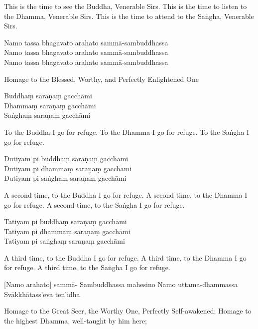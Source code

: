 \begin{english}
This is the time to see the Buddha, Venerable Sirs.
This is the time to listen to the Dhamma, Venerable Sirs.
This is the time to attend to the Saṅgha, Venerable Sirs.
\end{english}

\suttaRef{[Thai]}

Namo tassa bhagavato arahato sammā-sambuddhassa\\
Namo tassa bhagavato arahato sammā-sambuddhassa\\
Namo tassa bhagavato arahato sammā-sambuddhassa

\begin{english}
  Homage to the Blessed, Worthy, and Perfectly Enlightened One
\end{english}

Buddhaṃ saraṇaṃ gacchāmi\\
Dhammaṃ saraṇaṃ gacchāmi\\
Saṅghaṃ saraṇaṃ gacchāmi

\begin{english}
  To the Buddha I go for refuge.
  To the Dhamma I go for refuge.
  To the Saṅgha I go for refuge.
\end{english}

Dutiyam pi buddhaṃ saraṇaṃ gacchāmi\\
Dutiyam pi dhammaṃ saraṇaṃ gacchāmi\\
Dutiyam pi saṅghaṃ saraṇaṃ gacchāmi

\begin{english}
  A second time, to the Buddha I go for refuge.
  A second time, to the Dhamma I go for refuge.
  A second time, to the Saṅgha I go for refuge.
\end{english}

Tatiyam pi buddhaṃ saraṇaṃ gacchāmi\\
Tatiyam pi dhammaṃ saraṇaṃ gacchāmi\\
Tatiyam pi saṅghaṃ saraṇaṃ gacchāmi

\begin{english}
  A third time, to the Buddha I go for refuge.
  A third time, to the Dhamma I go for refuge.
  A third time, to the Saṅgha I go for refuge.
\end{english}

[Namo arahato] sammā-
Sambuddhassa mahesino
Namo uttama-dhammassa
Svākkhātass’eva ten’idha

\begin{english}
Homage to the Great Seer, the Worthy One, Perfectly Self-awakened; Homage to the highest Dhamma, well-taught by him here;
\end{english}

